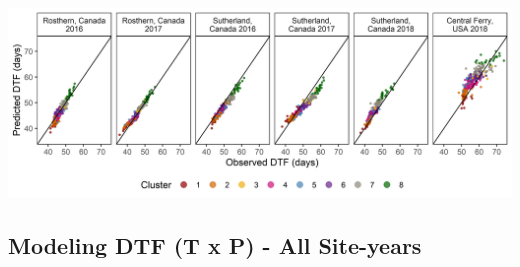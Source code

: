 \documentclass[
]{article}
\begin{document}
\includegraphics{Additional/Model/Model_3_1.png}

\hypertarget{modeling-dtf-t-x-p---all-site-years}{%
\subsection{Modeling DTF (T x P) - All
Site-years}\label{modeling-dtf-t-x-p---all-site-years}}
\end{document}

